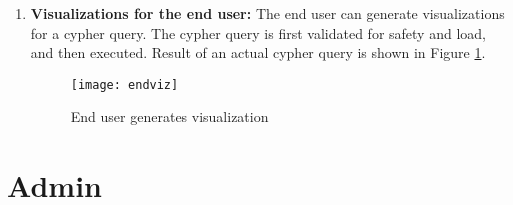 \begin{enumerate}
\item \textbf{Visualizations for the end user:} The end user can generate visualizations for a cypher query. The cypher query is first validated for safety and load, and then executed. Result of an actual cypher query is shown in Figure \ref{fig:endviz}.

\begin{figure}[H]
\begin{center}  
\texttt{[image: endviz]} 
\caption{End user generates visualization}
\label{fig:endviz}
\end{center}
\end{figure}


\end{enumerate}



\section{Admin}

